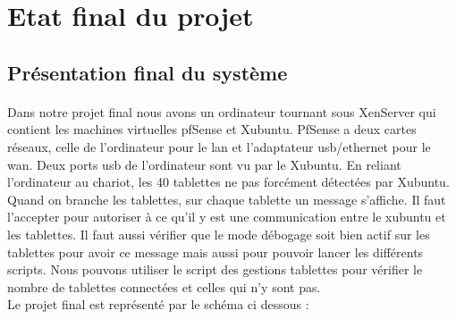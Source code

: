\documentclass[a4paper,12pt]{extarticle}
\begin{document}
\section{Etat final du projet}
\subsection{Présentation final du système}

\paragraph{}
Dans notre projet final nous avons un ordinateur tournant sous XenServer qui contient les machines virtuelles pfSense et Xubuntu. PfSense a deux cartes réseaux, celle de l’ordinateur pour le lan et l’adaptateur usb/ethernet pour le wan. Deux ports usb de l’ordinateur sont vu par le Xubuntu. En reliant l’ordinateur au chariot, les 40 tablettes ne pas forcément détectées par Xubuntu. Quand on branche les tablettes, sur chaque tablette un message s’affiche. 
Il faut l’accepter pour autoriser à ce qu’il y est une communication entre le xubuntu et les tablettes. Il faut aussi vérifier que le mode débogage soit bien actif sur les tablettes pour avoir ce message mais aussi pour pouvoir lancer les différents scripts. Nous pouvons utiliser le script des gestions tablettes pour vérifier le nombre de tablettes connectées et celles qui n’y sont pas. \\

Le projet final est représenté par le schéma ci dessous :

\clearpage
\end{document}
